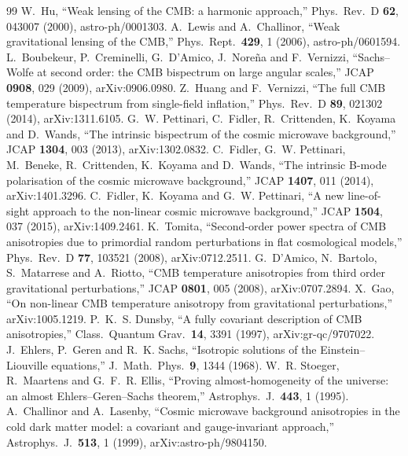 \begin{thebibliography}{99}
 W.~Hu, ``Weak lensing of the CMB: a harmonic approach,'' Phys.\ Rev.\ D {\bf 62}, 043007 (2000), astro-ph/0001303.
 A.~Lewis and A.~Challinor, ``Weak gravitational lensing of the CMB,'' Phys.\ Rept.\ {\bf 429}, 1 (2006), astro-ph/0601594.
 L.~Boubekeur, P.~Creminelli, G.~D'Amico, J.~Nore\~na and F.~Vernizzi, ``Sachs--Wolfe at second order: the CMB bispectrum on large angular scales,'' JCAP {\bf 0908}, 029 (2009), arXiv:0906.0980.
 Z.~Huang and F.~Vernizzi, ``The full CMB temperature bispectrum from single-field inflation,'' Phys.\ Rev.\ D {\bf 89}, 021302 (2014), arXiv:1311.6105.
 G.~W. Pettinari, C.~Fidler, R.~Crittenden, K.~Koyama and D.~Wands, ``The intrinsic bispectrum of the cosmic microwave background,'' JCAP {\bf 1304}, 003 (2013), arXiv:1302.0832.
 C.~Fidler, G.~W. Pettinari, M.~Beneke, R.~Crittenden, K.~Koyama and D.~Wands, ``The intrinsic B-mode polarisation of the cosmic microwave background,'' JCAP {\bf 1407}, 011 (2014), arXiv:1401.3296.
 C.~Fidler, K.~Koyama and G.~W. Pettinari, ``A new line-of-sight approach to the non-linear cosmic microwave background,'' JCAP {\bf 1504}, 037 (2015), arXiv:1409.2461.
 K.~Tomita, ``Second-order power spectra of CMB anisotropies due to primordial random perturbations in flat cosmological models,'' Phys.\ Rev.\ D {\bf 77}, 103521 (2008), arXiv:0712.2511.
 G.~D'Amico, N.~Bartolo, S.~Matarrese and A.~Riotto, ``CMB temperature anisotropies from third order gravitational perturbations,'' JCAP {\bf 0801}, 005 (2008), arXiv:0707.2894.
 X.~Gao, ``On non-linear CMB temperature anisotropy from gravitational perturbations,'' arXiv:1005.1219.
 P.~K.~S. Dunsby, ``A fully covariant description of CMB anisotropies,'' Class.\ Quantum Grav.\ {\bf 14}, 3391 (1997), arXiv:gr-qc/9707022.
 J.~Ehlers, P.~Geren and R.~K. Sachs, ``Isotropic solutions of the Einstein--Liouville equations,'' J.\ Math.\ Phys.\ {\bf 9}, 1344 (1968).
 W.~R. Stoeger, R.~Maartens and G.~F.~R. Ellis, ``Proving almost-homogeneity of the universe: an almost Ehlers--Geren--Sachs theorem,'' Astrophys.\ J.\ {\bf 443}, 1 (1995).
 A.~Challinor and A.~Lasenby, ``Cosmic microwave background anisotropies in the cold dark matter model: a covariant and gauge-invariant approach,'' Astrophys.\ J.\ {\bf 513}, 1 (1999), arXiv:astro-ph/9804150.
\end{thebibliography}
